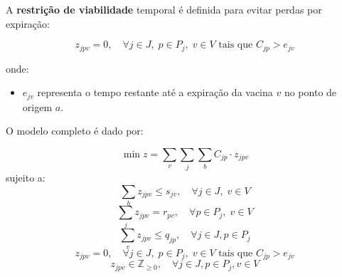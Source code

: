 A \textbf{restrição de viabilidade} temporal é definida para evitar perdas por expiração:

\begin{equation*}
z_{jpv} = 0, \quad \forall j \in J, \; p \in P_j, \; v \in V \text{ tais que } C_{jp} > e_{jv}
\end{equation*}

onde:
\begin{itemize}
    \item $e_{jv}$ representa o tempo restante até a expiração da vacina $v$ no ponto de origem $a$.
\end{itemize}

O modelo completo é dado por:

\begin{equation*}
\min z = \sum_{v} \sum_{j} \sum_{b} C_{jp} \cdot z_{jpv}
\end{equation*}
sujeito a:
\begin{equation*}
\sum_{b} z_{jpv} \le s_{jv}, \quad \forall j \in J, \; v \in V
\end{equation*}
\begin{equation*}
\sum_{j} z_{jpv} = r_{pv}, \quad \forall p \in P_j, \; v \in V
\end{equation*}
\begin{equation*}
\sum_{v} z_{jpv} \le q_{jp}, \quad \forall j \in J, p \in P_j
\end{equation*}
\begin{equation*}
z_{jpv} = 0, \quad \forall j \in J, \; p \in P_j, \; v \in V \text{ tais que } C_{jp} > e_{jv}
\end{equation*}
\begin{equation*}
z_{jpv} \in \mathbb{Z}_{\geq 0}, \quad \forall j \in J, p \in P_j, v \in V
\end{equation*}


\bigskip